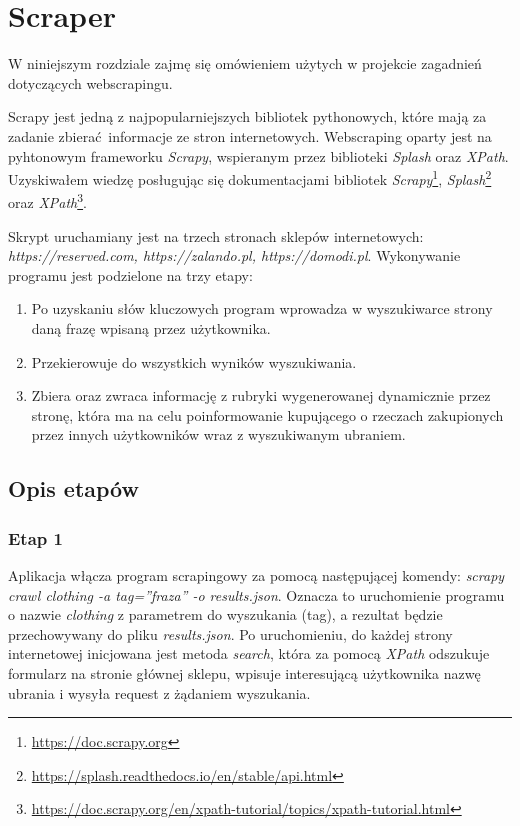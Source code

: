 \chapter {Scraper} 

W niniejszym rozdziale zajmę się omówieniem użytych w projekcie zagadnień dotyczących webscrapingu.

Scrapy jest jedną z najpopularniejszych bibliotek pythonowych, które mają za zadanie zbierać informacje ze stron internetowych.
Webscraping oparty jest na pyhtonowym frameworku \emph{Scrapy}, wspieranym przez biblioteki \emph{Splash} oraz \emph{XPath}.
Uzyskiwałem wiedzę posługując się dokumentacjami bibliotek \emph{Scrapy}\footnote{\url{https://doc.scrapy.org}}, \emph{Splash}\footnote{\url{https://splash.readthedocs.io/en/stable/api.html}} oraz \emph{XPath}\footnote{\url{https://doc.scrapy.org/en/xpath-tutorial/topics/xpath-tutorial.html}}.

Skrypt uruchamiany jest na trzech stronach sklepów internetowych: \emph{https://reserved.com, https://zalando.pl, https://domodi.pl}. 
Wykonywanie programu jest podzielone na trzy etapy:
\begin{enumerate}
	\item Po uzyskaniu słów kluczowych program wprowadza w wyszukiwarce strony daną frazę wpisaną przez użytkownika.
	\item Przekierowuje do wszystkich wyników wyszukiwania.
	\item Zbiera oraz zwraca informację z rubryki wygenerowanej dynamicznie przez stronę, która	ma na celu poinformowanie kupującego o rzeczach zakupionych przez innych użytkowników wraz z wyszukiwanym ubraniem.
\end{enumerate}
\section{Opis etapów}

\subsection{Etap 1}
	Aplikacja włącza program scrapingowy za pomocą następującej komendy: \emph{scrapy crawl clothing -a tag=”fraza” -o results.json}.
Oznacza to uruchomienie programu o nazwie \emph{clothing} z parametrem do wyszukania (tag), a rezultat będzie przechowywany do pliku \emph{results.json}.
Po uruchomieniu, do każdej strony internetowej inicjowana jest metoda \emph{search}, która za pomocą \emph{XPath} odszukuje formularz na stronie głównej sklepu, wpisuje interesującą użytkownika nazwę ubrania i wysyła request z żądaniem wyszukania.

